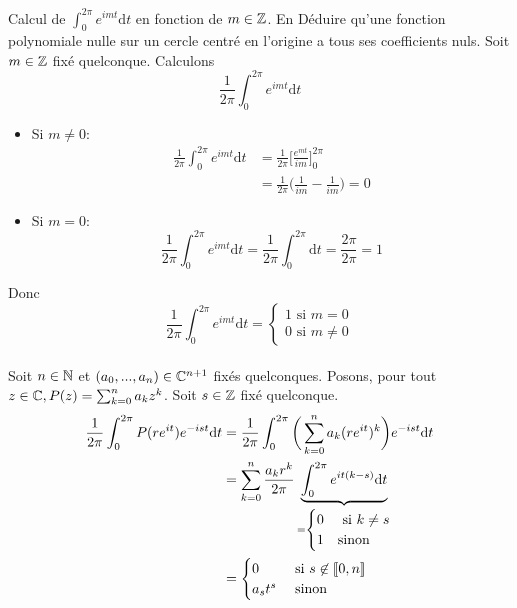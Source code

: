 \documentclass{article}
\begin{document}
\pagebreak

\begin{question_kholle}{Calcul de $\displaystyle\int_0^{2\pi}e^{imt} \mathrm d t$ en fonction de $m \in \mathbb Z$. En Déduire qu'une fonction polynomiale nulle sur un cercle centré en l'origine a tous ses coefficients nuls.}
    Soit $m \in \mathbb Z$ fixé quelconque. Calculons
    $$\frac{1}{2 \pi} \int_0^{2\pi}e^{imt} \mathrm d t$$
    \begin{itemize}[label=$\star$]
        \item Si $m \neq 0$:
              \begin{align*}
                  \frac{1}{2 \pi} \int_0^{2\pi}e^{imt} \mathrm d t & = \frac{1}{2 \pi} \Big[ \frac{e^{mt}}{im} \Big]_0^{2\pi}      \\
                                                                   & = \frac{1}{2 \pi} \Big( \frac{1}{im} - \frac{1}{im} \Big) = 0
              \end{align*}
        \item Si $m = 0$:
              $$
                  \frac{1}{2 \pi} \int_0^{2\pi}e^{imt} \mathrm d t = \frac{1}{2 \pi} \int_0^{2\pi} \mathrm d t = \frac{2 \pi}{2 \pi} = 1
              $$
    \end{itemize}
    Donc $$\frac{1}{2 \pi} \int_0^{2\pi}e^{imt} \mathrm d t =
        \begin{cases}
            1 \text{ si } m=0 \\
            0 \text{ si } m \neq 0
        \end{cases}
    $$
    \\
    Soit $n\in \mathbb N$ et $(a_0, ..., a_n) \in \mathbb C^{n+1}$ fixés quelconques. Posons, pour tout $z\in\mathbb C, P(z) = \sum_{k=0}^n a_k z^k$. Soit $s\in\mathbb Z$ fixé quelconque.
    \begin{align*}
        \frac{1}{2 \pi} \int_0^{2\pi} P(re^{it}) e^{-ist} \mathrm d t & = \frac{1}{2 \pi} \int_0^{2\pi} \bigg (\sum_{k=0}^n a_k (re^{it})^k \bigg) e^{-ist} \mathrm d t                                                       \\
                                                                      & = \sum_{k=0}^n \frac{a_k r^k}{2\pi} \underbrace{\int_0^{2\pi} e^{it(k-s)} \dd t}_{=\begin{cases}0&\text{ si $k\neq s$} \\ 1 &\text{sinon}\end{cases}} \\
                                                                      & = \begin{cases}0 & \text{ si $s\not\in\iset{0,n}$}\\a_st^s &\text{ sinon}\end{cases}

\end{align*}
\end{question_kholle}
\end{document}
